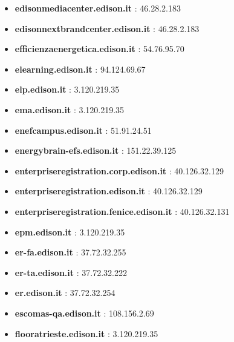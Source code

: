 \documentclass{article}
\begin{document}
\begin{itemize}
            \item \textbf{ edisonmediacenter.edison.it }: 46.28.2.183
        
            \item \textbf{ edisonnextbrandcenter.edison.it }: 46.28.2.183
        
            \item \textbf{ efficienzaenergetica.edison.it }: 54.76.95.70
        
            \item \textbf{ elearning.edison.it }: 94.124.69.67
        
            \item \textbf{ elp.edison.it }: 3.120.219.35
        
            \item \textbf{ ema.edison.it }: 3.120.219.35
        
            \item \textbf{ enefcampus.edison.it }: 51.91.24.51
        
            \item \textbf{ energybrain-efs.edison.it }: 151.22.39.125
        
            \item \textbf{ enterpriseregistration.corp.edison.it }: 40.126.32.129
        
            \item \textbf{ enterpriseregistration.edison.it }: 40.126.32.129
        
            \item \textbf{ enterpriseregistration.fenice.edison.it }: 40.126.32.131
        
            \item \textbf{ epm.edison.it }: 3.120.219.35
        
            \item \textbf{ er-fa.edison.it }: 37.72.32.255
        
            \item \textbf{ er-ta.edison.it }: 37.72.32.222
        
            \item \textbf{ er.edison.it }: 37.72.32.254
        
            \item \textbf{ escomas-qa.edison.it }: 108.156.2.69
        
            \item \textbf{ flooratrieste.edison.it }: 3.120.219.35
        

\end{itemize}
\end{document}
